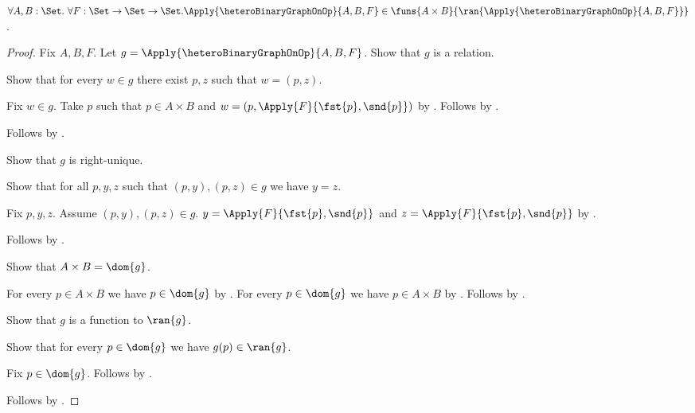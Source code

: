 \begin{theorem}\label{logical_heterogeneous_binary_graph_on_function}
    $\forall A,B:\Set.\ \forall F:\Set\to\Set\to\Set.
        \Apply{\heteroBinaryGraphOnOp}{A,B,F}
            \in
            \funs{A\times B}
                {\ran{\Apply{\heteroBinaryGraphOnOp}{A,B,F}}}$.
\end{theorem}
\begin{proof}
    Fix $A,B,F$.
    Let $g=\Apply{\heteroBinaryGraphOnOp}{A,B,F}$.
    Show that $g$ is a relation.
    \begin{subproof}
        Show that for every $w\in g$ there exist $p,z$ such that
            $w=(p,z)$.
        \begin{subproof}
            Fix $w\in g$.
            Take $p$ such that $p\in A\times B$ and
                $w=(p,\Apply{F}{\fst{p},\snd{p}})$
                by .
            Follows by \auto.
        \end{subproof}
        Follows by .
    \end{subproof}
    Show that $g$ is right-unique.
    \begin{subproof}
        Show that for all $p,y,z$ such that $(p,y),(p,z)\in g$
            we have $y=z$.
        \begin{subproof}
            Fix $p,y,z$.
            Assume $(p,y),(p,z)\in g$.
            $y=\Apply{F}{\fst{p},\snd{p}}$ and
                $z=\Apply{F}{\fst{p},\snd{p}}$ by
                .
        \end{subproof}
        Follows by .
    \end{subproof}
    Show that $A\times B=\dom{g}$.
    \begin{subproof}
        For every $p\in A\times B$ we have $p\in\dom{g}$ by
            .
        For every $p\in\dom{g}$ we have $p\in A\times B$ by
            .
        Follows by .
    \end{subproof}
    Show that $g$ is a function to $\ran{g}$.
    \begin{subproof}
        Show that for every $p\in\dom{g}$ we have $g(p)\in\ran{g}$.
        \begin{subproof}
            Fix $p\in\dom{g}$.
            Follows by .
        \end{subproof}
    \end{subproof}
    Follows by .
\end{proof}


